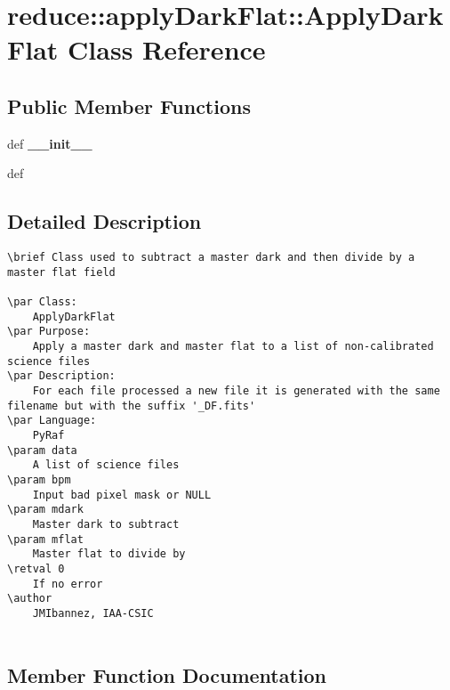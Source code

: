 \section{reduce::apply\-Dark\-Flat::Apply\-Dark\-Flat Class Reference}
\label{classreduce_1_1applyDarkFlat_1_1ApplyDarkFlat}
\subsection*{Public Member Functions}
\begin{CompactItemize}
\item 
def \textbf{\_\-\_\-init\_\-\_\-}\label{classreduce_1_1applyDarkFlat_1_1ApplyDarkFlat_b1cf0442580ddd1b45cd62cdf7d09586}

\item 
def {\bfapply}
\end{CompactItemize}


\subsection{Detailed Description}


\footnotesize\begin{verbatim}
\brief Class used to subtract a master dark and then divide by a master flat field

\par Class:
    ApplyDarkFlat
\par Purpose:
    Apply a master dark and master flat to a list of non-calibrated science files
\par Description:
    For each file processed a new file it is generated with the same filename but with the suffix '_DF.fits'
\par Language:
    PyRaf
\param data
    A list of science files
\param bpm
    Input bad pixel mask or NULL
\param mdark
    Master dark to subtract
\param mflat
    Master flat to divide by
\retval 0
    If no error
\author
    JMIbannez, IAA-CSIC
  
\end{verbatim}
\normalsize
 



\subsection{Member Function Documentation}
